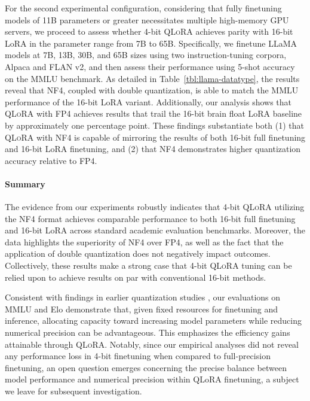 For the second experimental configuration, considering that fully finetuning models of 11B parameters or greater necessitates multiple high-memory GPU servers, we proceed to assess whether 4-bit \textsc{QLoRA} achieves parity with 16-bit LoRA in the parameter range from 7B to 65B. Specifically, we finetune LLaMA models at 7B, 13B, 30B, and 65B sizes using two instruction-tuning corpora, Alpaca and FLAN v2, and then assess their performance using 5-shot accuracy on the MMLU benchmark. As detailed in Table~\ref{tbl:llama-datatype}, the results reveal that NF4, coupled with double quantization, is able to match the MMLU performance of the 16-bit LoRA variant. Additionally, our analysis shows that \textsc{QLoRA} with FP4 achieves results that trail the 16-bit brain float LoRA baseline by approximately one percentage point. These findings substantiate both (1) that \textsc{QLoRA} with NF4 is capable of mirroring the results of both 16-bit full finetuning and 16-bit LoRA finetuning, and (2) that NF4 demonstrates higher quantization accuracy relative to FP4.

\paragraph{Summary} The evidence from our experiments robustly indicates that 4-bit \textsc{QLoRA} utilizing the NF4 format achieves comparable performance to both 16-bit full finetuning and 16-bit LoRA across standard academic evaluation benchmarks. Moreover, the data highlights the superiority of NF4 over FP4, as well as the fact that the application of double quantization does not negatively impact outcomes. Collectively, these results make a strong case that 4-bit \textsc{QLoRA} tuning can be relied upon to achieve results on par with conventional 16-bit methods.

Consistent with findings in earlier quantization studies \citep{dettmers2022case}, our evaluations on MMLU and Elo demonstrate that, given fixed resources for finetuning and inference, allocating capacity toward increasing model parameters while reducing numerical precision can be advantageous. This emphasizes the efficiency gains attainable through \textsc{QLoRA}. Notably, since our empirical analyses did not reveal any performance loss in 4-bit finetuning when compared to full-precision finetuning, an open question emerges concerning the precise balance between model performance and numerical precision within QLoRA finetuning, a subject we leave for subsequent investigation.

